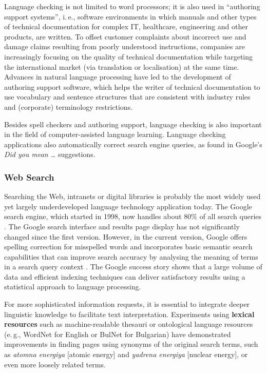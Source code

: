 \begin{multicols}{2}
  Language checking is not limited to word processors; it is also used in “authoring support systems”, i.\,e., software environments in which manuals and other types of technical documentation for complex IT, healthcare, engineering and other products, are written. To offset customer complaints about incorrect use and damage claims resulting from poorly understood instructions, companies are increasingly focusing on the quality of technical documentation while targeting the international market (via translation or localisation) at the same time. Advances in natural language processing have led to the development of authoring support software, which helps the writer of technical documentation to use vocabulary and sentence structures that are consistent with industry rules and (corporate) terminology restrictions.


  Besides spell checkers and authoring support, language checking is also important in the field of computer-assisted language learning. 
  Language checking applications also automatically correct search engine queries, as found in Google's \textit{Did you mean \dots} suggestions.

  \subsubsection{Web Search}

  Searching the Web, intranets or digital libraries is probably the most widely used yet largely underdeveloped language technology application today. The Google search engine, which started in 1998, now handles about 80\% of all search queries \cite{spi1}. 
  The Google search interface and results page display has not significantly changed since the first version. However, in the current version, Google offers spelling correction for misspelled words and incorporates basic semantic search capabilities that can improve search accuracy by analysing the meaning of terms in a search query context \cite{pc1}. The Google success story shows that a large volume of data and efficient indexing techniques can deliver satisfactory results using a statistical approach to language processing. 

  For more sophisticated information requests, it is essential to integrate deeper linguistic knowledge to facilitate text interpretation. Experiments using \textbf{lexical resources} such as machine-readable thesauri or ontological language resources (e.\,g., WordNet for English or BulNet for Bulgarian) have demonstrated improvements in finding pages using synonyms of the original search terms, such as {\it atomna energiya} [atomic energy] and {\it yadrena energiya} [nuclear energy], or even more loosely related terms. 


\end{multicols}
